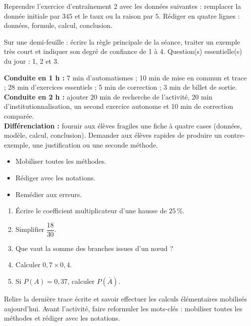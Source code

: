 
    \begin{dm}Reprendre l'exercice d'entraînement 2 avec les données suivantes : remplacer la donnée initiale par $345$ et le taux ou la raison par $5$. Rédiger en quatre lignes : données, formule, calcul, conclusion.\end{dm}

    \begin{sortie}Sur une demi-feuille : écrire la règle principale de la séance, traiter un exemple très court et indiquer son degré de confiance de 1 à 4. Question(s) essentielle(s) du jour : 1, 2 et 3.\end{sortie}

    \ifprof
    \begin{methode}
    \textbf{Conduite en 1 h :} 7 min d'automatismes ; 10 min de mise en commun et trace ; 28 min d'exercices essentiels ; 5 min de correction ; 3 min de billet de sortie.\\
    \textbf{Conduite en 2 h :} ajouter 20 min de recherche de l'activité, 20 min d'institutionnalisation, un second exercice autonome et 10 min de correction comparée.\\
    \textbf{Différenciation :} fournir aux élèves fragiles une fiche à quatre cases (données, modèle, calcul, conclusion). Demander aux élèves rapides de produire un contre-exemple, une justification ou une seconde méthode.
    \end{methode}
    \fi
{}
\begin{objectifs}\begin{itemize}\item Mobiliser toutes les méthodes.\item Rédiger avec les notations.\item Remédier aux erreurs.\end{itemize}\end{objectifs}
\begin{automatismes}\begin{enumerate}\item Écrire le coefficient multiplicateur d'une hausse de $25\,\%$. \item Simplifier $\dfrac{18}{30}$. \item Que vaut la somme des branches issues d'un nœud ? \item Calculer $0{,}7\times0{,}4$. \item Si $P(A)=0{,}37$, calculer $P(\overline A)$. \end{enumerate}\end{automatismes}
\begin{prerequis}Relire la dernière trace écrite et savoir effectuer les calculs élémentaires mobilisés aujourd'hui. Avant l'activité, faire reformuler les mots-clés : mobiliser toutes les méthodes et rédiger avec les notations.\end{prerequis}


